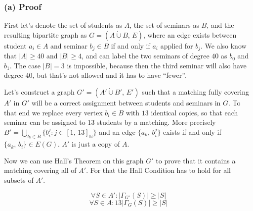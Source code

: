 \documentclass{article}
\newcommand{\N}{\mathbb{N}}
\begin{document}
  \subsubsection*{(a) Proof}
  First let's denote the set of students as $A$, the set of seminars as $B$,
  and the resulting bipartite graph as $G=(A \dot\cup B,\, E)$,
  where an edge exists between student $a_i \in A$ and seminar $b_j \in B$ if and only if $a_i$ applied for $b_j$.
  We also know that $|A| \geq 40$ and $|B| \geq 4$, and can label the two seminars of degree $40$ as $b_0$ and $b_1$.
  The case $|B| = 3$ is impossible, because then the third seminar will also have degree $40$,
  but that's not allowed and it has to have ``fewer''.

  Let's construct a graph $G'=(A' \dot\cup B',\, E')$ such that a matching fully covering $A'$ in $G'$
  will be a correct assignment  between students and seminars in $G$.
  To that end we replace every vertex $b_i \in B$ with $13$ identical copies,
  so that each seminar can be assigned to $13$ students by a matching.
  More precisely $B' = \bigcup_{b_i \in B} \{b_i^j : j \in [1,\, 13]_\N \}$
  and an edge $\{a_k,\, b_i^j\}$ exists if and only if $\{a_k,\, b_i\} \in E(G)$.
  $A'$ is just a copy of $A$.

  Now we can use Hall's Theorem on this graph $G'$ to prove that it contains a matching covering all of $A'$.
  For that the Hall Condition has to hold for all subsets of $A'$.

  \[ \forall S \in A' : |\Gamma_{G'}(S)| \geq |S| \]
  \[ \forall S \in A : 13|\Gamma_{G}(S)| \geq |S| \]
\end{document}
